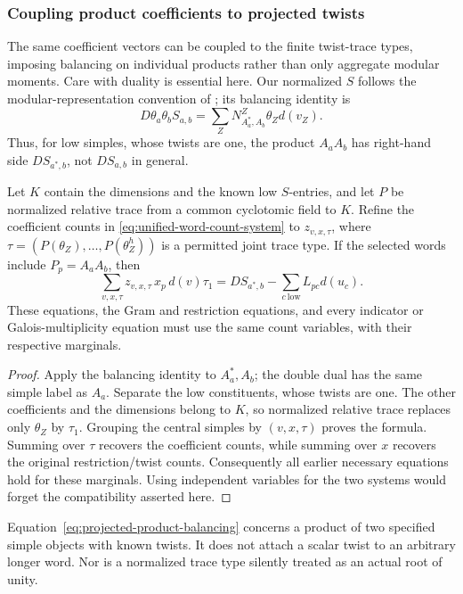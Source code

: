 \subsubsection{Coupling product coefficients to projected twists}

The same coefficient vectors can be coupled to the finite twist-trace
types, imposing balancing on individual products rather than only
aggregate modular moments. Care with duality is essential here.
Our normalized $S$ follows the modular-representation convention of
\cite[equation~(2.3)]{BNRW}; its balancing identity is
\[
 D\theta_a\theta_b S_{a,b}
   =\sum_Z N_{A_a^*,A_b}^{Z}\theta_Zd(v_Z).
\]
Thus, for low simples, whose twists are one, the product $A_aA_b$
has right-hand side $D S_{a^*,b}$, not $D S_{a,b}$ in general.

\begin{proposition}
\label{prop:projected-product-balancing}
Let $K$ contain the dimensions and the known low $S$-entries, and let
$P$ be normalized relative trace from a common cyclotomic field to $K$.
Refine the coefficient counts in \eqref{eq:unified-word-count-system}
to $z_{v,x,\tau}$, where
$\tau=(P(\theta_Z),\ldots,P(\theta_Z^h))$ is a permitted joint trace
type. If the selected words include $P_p=A_aA_b$, then
\begin{equation}\label{eq:projected-product-balancing}
 \sum_{v,x,\tau}z_{v,x,\tau}\,x_p\,d(v)\tau_1
 =D S_{a^*,b}-\sum_{c\ \mathrm{low}}L_{pc}d(u_c).
\end{equation}
These equations, the Gram and restriction equations, and every
indicator or Galois-multiplicity equation must use the same count
variables, with their respective marginals.
\end{proposition}
\begin{proof}
Apply the balancing identity to $A_a^*,A_b$; the double dual has the
same simple label as $A_a$. Separate the low constituents, whose
twists are one. The other coefficients and the dimensions belong to
$K$, so normalized relative trace replaces only $\theta_Z$ by
$\tau_1$. Grouping the central simples by $(v,x,\tau)$ proves the
formula. Summing over $\tau$ recovers the coefficient counts, while
summing over $x$ recovers the original restriction/twist counts.
Consequently all earlier necessary equations hold for these marginals.
Using independent variables for the two systems would forget the
compatibility asserted here.
\end{proof}

Equation~\eqref{eq:projected-product-balancing} concerns a product of
two specified simple objects with known twists. It does not attach a
scalar twist to an arbitrary longer word. Nor is a normalized trace
type silently treated as an actual root of unity.

